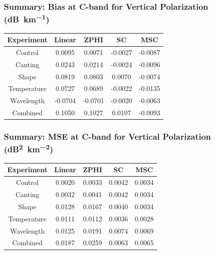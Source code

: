 \documentclass[red]{beamer}
\begin{document}
\begin{frame}
    \frametitle{Summary: Bias at C-band for Vertical Polarization (\si{dB\per \kilo\meter})}
    \begin{center}
        \begin{tabular}{| c | c | c | c | c |}
            \hline
            Experiment & Linear & ZPHI & SC & MSC \\
            \hline
            \hline
            Control & 0.0095 & 0.0071 & -0.0027 & -0.0087 \\
            Canting & 0.0243 & 0.0214 & -0.0024 & -0.0096 \\
            Shape & 0.0819 & 0.0803 & 0.0070 & -0.0074 \\
            Temperature & 0.0727 & 0.0689 & -0.0022 & -0.0135 \\
            Wavelength & -0.0704 & -0.0701 & -0.0020 & -0.0063 \\
            Combined & 0.1050 & 0.1027 & 0.0107 & -0.0093 \\
            \hline
        \end{tabular}
    \end{center}
\end{frame}

\begin{frame}
    \frametitle{Summary: MSE at C-band for Vertical Polarization (\si{dB\squared\per \kilo\meter\squared})}
    \begin{center}
        \begin{tabular}{| c | c | c | c | c |}
            \hline
            Experiment & Linear & ZPHI & SC & MSC \\
            \hline
            \hline
            Control & 0.0020 & 0.0033 & 0.0042 & 0.0034 \\
            Canting & 0.0032 & 0.0041 & 0.0042 & 0.0034 \\
            Shape & 0.0128 & 0.0167 & 0.0040 & 0.0034 \\
            Temperature & 0.0111 & 0.0112 & 0.0036 & 0.0028 \\
            Wavelength & 0.0125 & 0.0191 & 0.0074 & 0.0069 \\
            Combined & 0.0187 & 0.0259 & 0.0063 & 0.0065 \\
            \hline
        \end{tabular}
    \end{center}
\end{frame}
\end{document}
